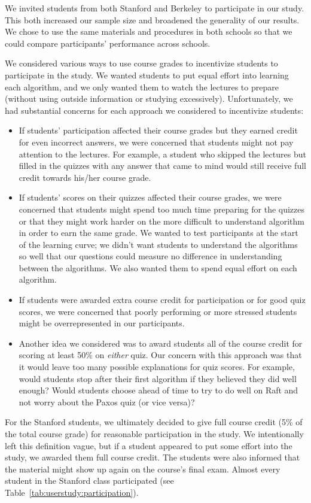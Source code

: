 We invited students from both Stanford and Berkeley to participate in our
study. This both
increased our sample size and broadened the generality of our results. We
chose to use the same materials and procedures in both schools so that
we could compare participants' performance across schools.

We considered various ways to use course grades to incentivize students
to participate in the study. We wanted students to put equal effort into
learning each algorithm, and we only wanted them to watch the lectures
to prepare (without using outside information or studying excessively).
Unfortunately, we had substantial
concerns for each approach we considered to incentivize students:
\begin{itemize}
\item If students' participation affected their course grades but they
earned credit for even incorrect answers, we were concerned that
students might not pay attention to the lectures. For example, a student
who skipped the lectures but filled in the quizzes with any answer that
came to mind would still receive full credit towards his/her course grade.
\item If students' scores on their quizzes affected their course grades,
we were concerned that students might spend too much time preparing for
the quizzes or that they might work harder on the more difficult to
understand algorithm in
order to earn the same grade. We wanted to test participants at the
start of the learning curve; we didn't want students to understand the
algorithms so well that our questions could measure no difference in
understanding between the algorithms. We also wanted them to spend equal
effort on each algorithm.
\item If students were awarded extra course credit for participation or
for good quiz scores, we were concerned that poorly performing or more
stressed students might be overrepresented in our participants.
\item Another idea we considered was to award students all of the course credit 
for scoring at least 50\% on \emph{either} quiz. Our
concern with
this approach was that it would leave too many possible explanations for
quiz scores. For example, would students stop after their first
algorithm if they believed they did well enough? Would students choose
ahead of time to try to do well on Raft and not worry about the Paxos
quiz (or vice versa)?
\end{itemize}

For the Stanford students, we ultimately decided to give full course
credit (5\% of the total course grade)
for reasonable participation in the study. We intentionally left
this definition vague, but if a student appeared to put some effort into
the study, we awarded them full course credit. The students were also
informed that the material might show up again on the course's final
exam. Almost every student in the Stanford class participated (see
Table~\ref{tab:userstudy:participation}).

